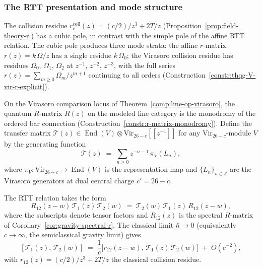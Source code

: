 \subsubsection{The RTT presentation and mode structure}
\label{subsubsec:virasoro-rtt}

The collision residue $r^{\mathrm{coll}}_c(z) = (c/2)/z^3 + 2T/z$
(Proposition~\ref{prop:field-theory-r}) has a cubic pole, in
contrast with the simple pole of the affine RTT relation. The cubic
pole produces three mode strata: the affine $r$-matrix
$r(z) = k\,\Omega/z$ has a single residue $k\,\Omega_0$; the
Virasoro collision residue has residues $\Omega_0$, $\Omega_1$,
$\Omega_2$ at $z^{-1}$, $z^{-2}$, $z^{-3}$, with the full series
$r(z) = \sum_{m \ge 0} \Omega_m/z^{m+1}$ continuing to all orders
(Construction~\ref{constr:thqg-V-vir-r-explicit}).

\begin{construction}
\label{constr:virasoro-rtt-relation}
On the Virasoro comparison locus of
Theorem~\ref{comp:line-op-virasoro}, the quantum $R$-matrix
$R(z)$ on the modeled line category is the
monodromy of the ordered bar connection
(Construction~\ref{constr:r-matrix-monodromy}).
Define the transfer matrix
$\mathcal{T}(z) \in
\operatorname{End}(V) \otimes
\mathrm{Vir}_{26-c}[\![z^{-1}]\!]$
for any $\mathrm{Vir}_{26-c}$-module $V$ by the generating function
\begin{equation}\label{eq:virasoro-transfer}
\mathcal{T}(z)
\;=\;
\sum_{n \ge 0}
z^{-n-1}\,
\pi_V(L_n),
\end{equation}
where $\pi_V \colon \mathrm{Vir}_{26-c} \to \operatorname{End}(V)$
is the representation map and $\{L_n\}_{n \in \mathbb{Z}}$ are the
Virasoro generators at dual central charge $c' = 26 - c$.

The RTT relation takes the form
\begin{equation}\label{eq:virasoro-rtt}
\boxed{
R_{12}(z{-}w)\,
\mathcal{T}_1(z)\,
\mathcal{T}_2(w)
\;=\;
\mathcal{T}_2(w)\,
\mathcal{T}_1(z)\,
R_{12}(z{-}w),
}
\end{equation}
where the subscripts denote tensor factors and
$R_{12}(z)$ is the spectral $R$-matrix of
Corollary~\textup{\ref{cor:gravity-spectral-r}}.
The classical limit $\hbar \to 0$ (equivalently
$c \to \infty$, the semiclassical gravity limit) gives
\begin{equation}\label{eq:virasoro-rtt-classical}
[\mathcal{T}_1(z),\, \mathcal{T}_2(w)]
\;=\;
\frac{1}{c}\bigl[r_{12}(z{-}w),\,
\mathcal{T}_1(z)\,\mathcal{T}_2(w)\bigr]
\;+\; O(c^{-2}),
\end{equation}
with $r_{12}(z) = (c/2)/z^3 + 2T/z$ the classical
collision residue.
\end{construction}

